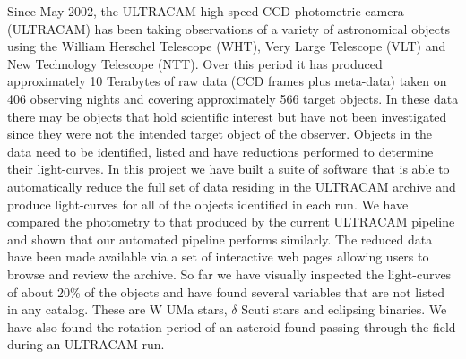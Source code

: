 Since May 2002, the  ULTRACAM high-speed CCD photometric camera (ULTRACAM) has been taking observations of a variety of astronomical objects using the William Herschel Telescope (WHT), Very Large Telescope (VLT) and New Technology Telescope (NTT). Over this period it has produced approximately 10 Terabytes of raw data (CCD frames plus meta-data) taken on 406 observing nights and covering approximately 566 target objects. In these data there may be objects that hold scientific interest but have not been investigated since they were not the intended target object of the observer. Objects in the data need to be identified, listed and have reductions performed to determine their light-curves. In this project we have built a suite of software that is able to automatically reduce the full set of data residing in the ULTRACAM archive and produce light-curves for all of the objects identified in each run. We have compared the photometry to that produced by the current ULTRACAM pipeline and shown that our automated pipeline performs similarly. The reduced data have been made available via a set of interactive web pages allowing users to browse and review the archive. So far we have visually inspected the light-curves of about 20\% of the objects and have found several variables that are not listed in any catalog. These are {W UMa} stars, $\delta$ Scuti stars and eclipsing binaries. We have also found the rotation period of an asteroid found passing through the field during an ULTRACAM run. 
